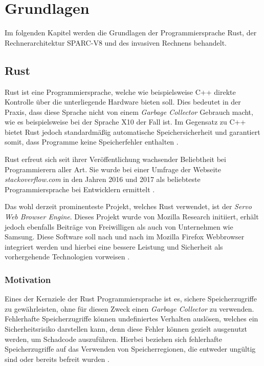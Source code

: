 \chapter{Grundlagen}\label{sec:basics}

Im folgenden Kapitel werden die Grundlagen der Programmiersprache Rust, der Rechnerarchitektur SPARC-V8 und
des invasiven Rechnens behandelt.

\section{Rust}

Rust ist eine Programmiersprache, welche wie beispielsweise C++ direkte Kontrolle über die
unterliegende Hardware bieten soll. Dies bedeutet in der Praxis, dass diese Sprache nicht von einem
\textit{Garbage Collector} Gebrauch macht, wie es beispielsweise bei der Sprache X10 der Fall ist.
Im Gegensatz zu C++ bietet Rust jedoch
standardmäßig automatische Speichersicherheit und garantiert somit, dass Programme keine Speicherfehler enthalten
\cite{theRustLanguage}.

Rust erfreut sich seit ihrer Veröffentlichung wachsender Beliebtheit bei Programmierern aller Art. Sie wurde
bei einer Umfrage der Webseite \textit{stackoverflow.com} in den Jahren 2016 und 2017 als beliebteste Programmiersprache bei
Entwicklern ermittelt \cite{stackoverflowSurvey}\cite{newStackoverflowSurvey}.

Das wohl derzeit prominenteste Projekt, welches Rust verwendet, ist der \textit{Servo Web Browser Engine}.
Dieses Projekt wurde von Mozilla Research initiiert, erhält jedoch ebenfalls Beiträge von Freiwilligen
als auch von Unternehmen wie Samsung.
Diese Software soll nach und nach im Mozilla Firefox Webbrowser integriert werden und hierbei eine bessere
Leistung und Sicherheit als vorhergehende Technologien vorweisen \cite{engineeringServo}.

\subsection{Motivation}

Eines der Kernziele der Rust Programmiersprache ist es, sichere Speicherzugriffe zu gewährleisten, ohne
für diesen Zweck einen \textit{Garbage Collector} zu verwenden. Fehlerhafte Speicherzugriffe können undefiniertes
Verhalten auslösen, welches ein Sicherheitsrisiko darstellen kann, denn diese Fehler können gezielt ausgenutzt
werden, um Schadcode auszuführen. Hierbei beziehen sich fehlerhafte Speicherzugriffe auf das Verwenden von 
Speicherregionen, die entweder ungültig sind oder bereits befreit wurden
\cite{engineeringServo}\cite{undefinedBehaviour}.

